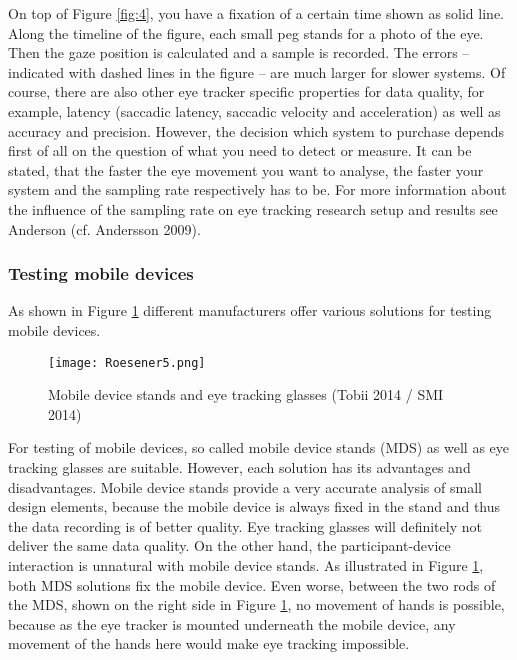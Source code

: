 \begin{
}[h]
On top of Figure \ref{fig:4}, you have a fixation of a certain time shown as solid line. Along the timeline of the figure, each small peg stands for a photo of the eye. Then the gaze position is calculated and a sample is recorded. The errors – indicated with dashed lines in the figure – are much larger for slower systems. Of course, there are also other eye tracker specific properties for data quality, for example, latency (saccadic latency, saccadic velocity and acceleration) as well as accuracy and precision. However, the decision which system to purchase depends first of all on the question of what you need to detect or measure. It can be stated, that the faster the eye movement you want to analyse, the faster your system and the sampling rate respectively has to be. For more information about the influence of the sampling rate on eye tracking research setup and results see Anderson (cf. Andersson 2009). 

\subsubsection{Testing mobile devices}

As shown in Figure \ref{fig:5} different manufacturers offer various solutions for testing mobile devices. 

\begin{figure}[h]
 \texttt{[image: Roesener5.png]}
 \caption{Mobile device stands and eye tracking glasses (Tobii 2014 / SMI 2014)}
 \label{fig:5}
\end{figure} 

For testing of mobile devices, so called mobile device stands (MDS) as well as eye tracking glasses are suitable. However, each solution has its advantages and disadvantages. Mobile device stands provide a very accurate analysis of small design elements, because the mobile device is always fixed in the stand and thus the data recording is of better quality. Eye tracking glasses will definitely not deliver the same data quality. On the other hand, the participant-device interaction is unnatural with mobile device stands. As illustrated in Figure \ref{fig:5}, both MDS solutions fix the mobile device. Even worse, between the two rods of the MDS, shown on the right side in Figure \ref{fig:5}, no movement of hands is possible, because as the eye tracker is mounted underneath the mobile device, any movement of the hands here would make eye tracking impossible.


\end{
}
